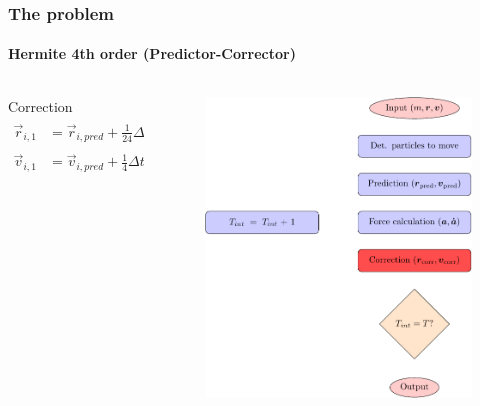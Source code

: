 \begin{frame}
\begin{columns}
\begin{column}{0.4\textwidth}
\begin{figure}
                \label{fig:algoritmo}
            \end{figure}
        \end{column}
    \end{columns}
\end{frame}

\begin{frame}
    \frametitle{The {\nbody} problem}
    \framesubtitle{Hermite 4th order (Predictor-Corrector)}
    \begin{columns}
        \begin{column}{0.6\textwidth}
        \begin{block}{Correction}
        \footnotesize
        \begin{align*}
            \vec{r}_{i,1} &= \vec{r}_{i,pred} +
                                \frac{1}{24}  \Delta t_{i}^{4} \vec{a}_{i,0}^{(2)} +
                                \frac{1}{120} \Delta t_{i}^{5} \vec{a}_{i,0}^{(3)} \\
            \vec{v}_{i,1} &= \vec{v}_{i,pred} +
                                \frac{1}{4}  \Delta t_{i}^{3} \vec{a}_{i,0}^{(2)} +
                                \frac{1}{24} \Delta t_{i}^{4} \vec{a}_{i,0}^{(3)}
        \end{align*}
        \end{block}
        \end{column}
        \begin{column}{0.4\textwidth}
            \begin{figure}
                \centering
                \includegraphics[height=0.55\textheight]{img/algorithm3}

\end{figure}
\end{column}
\end{columns}
\end{frame}
